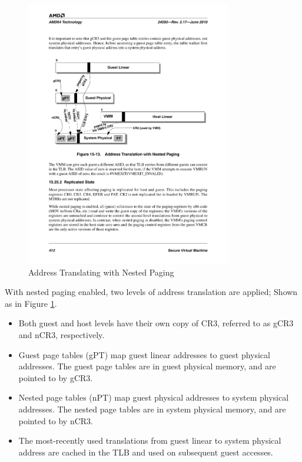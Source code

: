 \documentclass[a4paper,12pt]{article}
\begin{document}
\begin{figure}[!ht]
 \centerline{
 \includegraphics[width=0.8\textwidth]{NestedPaging}}
 \caption{Address Translating with Nested Paging} \label{fig:nestedpaging}
\end{figure}

With nested paging enabled, two levels of address translation are applied; Shown as in Figure \ref{fig:nestedpaging}.   

\begin{itemize} \item Both guest and host levels have their own copy of CR3, referred to as gCR3 and nCR3,
respectively.
\item Guest page tables (gPT) map guest linear addresses to guest physical addresses. The guest page tables are in guest physical memory, and are pointed to by gCR3.
\item	Nested page tables (nPT) map guest physical addresses to system physical addresses. The nested page tables are in system physical memory, and are pointed to by nCR3.
\item The most-recently used translations from guest linear to system physical address are cached in the TLB and used on subsequent guest accesses.
\end{itemize}
\end{document}
